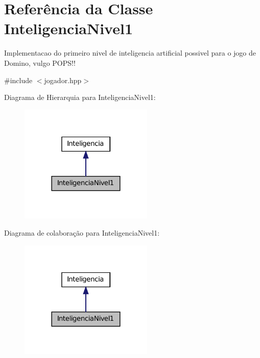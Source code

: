 \hypertarget{classInteligenciaNivel1}{
\section{Referência da Classe InteligenciaNivel1}
\label{classInteligenciaNivel1}
}


Implementacao do primeiro nivel de inteligencia artificial possivel para o jogo de Domino, vulgo POPS!!  




{\ttfamily \#include $<$jogador.hpp$>$}



Diagrama de Hierarquia para InteligenciaNivel1:\nopagebreak
\begin{figure}[H]
\begin{center}
\leavevmode
\includegraphics[width=180pt]{classInteligenciaNivel1__inherit__graph}
\end{center}
\end{figure}


Diagrama de colaboração para InteligenciaNivel1:\nopagebreak
\begin{figure}[H]
\begin{center}
\leavevmode
\includegraphics[width=180pt]{classInteligenciaNivel1__coll__graph}
\end{center}
\end{figure}
